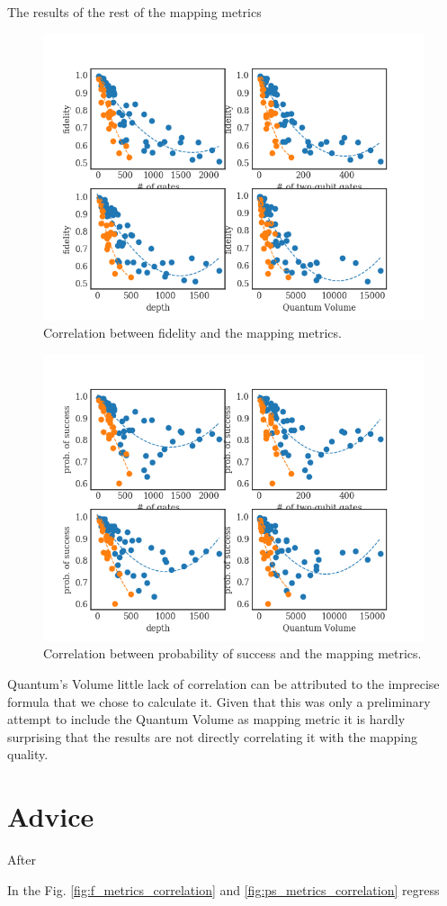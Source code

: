 The results of the rest of the mapping metrics 

\begin{figure}[htbp]
\centering
\includegraphics[width=\textwidth]{figures/f_metrics_correlation.png}
\caption{\label{fig:org0b49d82}
Correlation between fidelity and the mapping metrics.}
\end{figure}

\begin{figure}[htbp]
\centering
\includegraphics[width=\textwidth]{figures/ps_metrics_correlation.png}
\caption{\label{fig:org7e3f375}
Correlation between probability of success and the mapping metrics.}
\end{figure}



Quantum's Volume little lack of correlation can be attributed to the imprecise formula that we chose to calculate it.
Given that this was only a preliminary attempt to include the Quantum Volume as mapping metric it is hardly surprising that the results are not directly correlating it with the mapping quality.

\section{Advice}
\label{sec:orgaa530ab}
After 

In the Fig. \ref{fig:f_metrics_correlation} and \ref{fig:ps_metrics_correlation} regress

